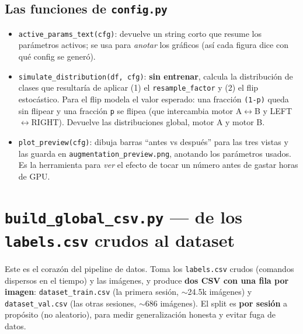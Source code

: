\documentclass[11pt,a4paper]{article}
\newcommand{\code}[1]{\lstinline[basicstyle=\ttfamily\normalsize]|#1|}
\begin{document}
\subsection*{Las funciones de \texttt{config.py}}
\begin{itemize}
  \item \code{active_params_text(cfg)}: devuelve un string corto que resume los parámetros activos; se usa para
  \emph{anotar} los gráficos (así cada figura dice con qué config se generó).
  \item \code{simulate_distribution(df, cfg)}: \textbf{sin entrenar}, calcula la distribución de clases que
  resultaría de aplicar (1) el \code{resample_factor} y (2) el flip estocástico. Para el flip modela el valor
  esperado: una fracción \code{(1-p)} queda sin flipear y una fracción \code{p} se flipea (que intercambia
  motor A$\leftrightarrow$B y LEFT$\leftrightarrow$RIGHT). Devuelve las distribuciones global, motor A y motor B.
  \item \code{plot_preview(cfg)}: dibuja barras ``antes vs después'' para las tres vistas y las guarda en
  \code{augmentation_preview.png}, anotando los parámetros usados. Es la herramienta para \emph{ver} el efecto
  de tocar un número antes de gastar horas de GPU.
\end{itemize}

\section{\texttt{build\_global\_csv.py} --- de los \texttt{labels.csv} crudos al dataset}
Este es el corazón del pipeline de datos. Toma los \code{labels.csv} crudos (comandos dispersos en el tiempo)
y las imágenes, y produce \textbf{dos CSV con una fila por imagen}: \code{dataset_train.csv} (la primera
sesión, $\sim$24.5k imágenes) y \code{dataset_val.csv} (las otras sesiones, $\sim$686 imágenes). El split es
\textbf{por sesión} a propósito (no aleatorio), para medir generalización honesta y evitar fuga de datos.


\end{document}
